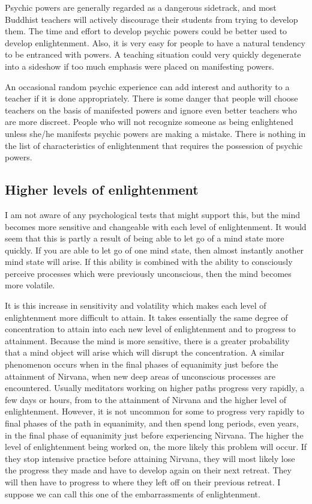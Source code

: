 \documentclass[a5paper,10pt,english]{book}
\begin{document}
\sphinxAtStartPar
Psychic powers are generally regarded as a dangerous sidetrack, and most
Buddhist teachers will actively discourage their students from trying to
develop them. The time and effort to develop psychic powers could be
better used to develop enlightenment. Also, it is very easy for people
to have a natural tendency to be entranced with powers. A teaching
situation could very quickly degenerate into a sideshow if too much
emphasis were placed on manifesting powers.

\sphinxAtStartPar
An occasional random psychic experience can add interest and authority
to a teacher if it is done appropriately. There is some danger that
people will choose teachers on the basis of manifested powers and ignore
even better teachers who are more discreet. People who will not
recognize someone as being enlightened unless she/he manifests psychic
powers are making a mistake. There is nothing in the list of
characteristics of enlightenment that requires the possession of psychic
powers.


\subsection{Higher levels of enlightenment}
\label{\detokenize{saints:higher-levels-of-enlightenment}}
\sphinxAtStartPar
I am not aware of any psychological tests that might support this, but
the mind becomes more sensitive and changeable with each level of
enlightenment. It would seem that this is partly a result of being able
to let go of a mind state more quickly. If you are able to let go of one
mind state, then almost instantly another mind state will arise. If this
ability is combined with the ability to consciously perceive processes
which were previously unconscious, then the mind becomes more volatile.

\sphinxAtStartPar
It is this increase in sensitivity and volatility which makes each level
of enlightenment more difficult to attain. It takes essentially the same
degree of concentration to attain  into each new level
of enlightenment and to progress to attainment. Because the mind is more
sensitive, there is a greater probability that a mind object will arise
which will disrupt the concentration. A similar phenomenon occurs when
in the final phases of equanimity just before the attainment of Nirvana,
when new deep areas of unconscious processes are encountered. Usually
meditators working on higher paths progress very rapidly, a few days or
hours, from  to the attainment of Nirvana and the higher
level of enlightenment. However, it is not uncommon for some to progress
very rapidly to final phases of the path in equanimity, and then spend
long periods, even years, in the final phase of equanimity just before
experiencing Nirvana. The higher the level of enlightenment being worked
on, the more likely this problem will occur. If they stop intensive
practice before attaining Nirvana, they will most likely lose the
progress they made and have to develop  again on their
next retreat. They will then have to progress to where they left off on
their previous retreat. I suppose we can call this one of the
embarrassments of enlightenment.
\end{document}

